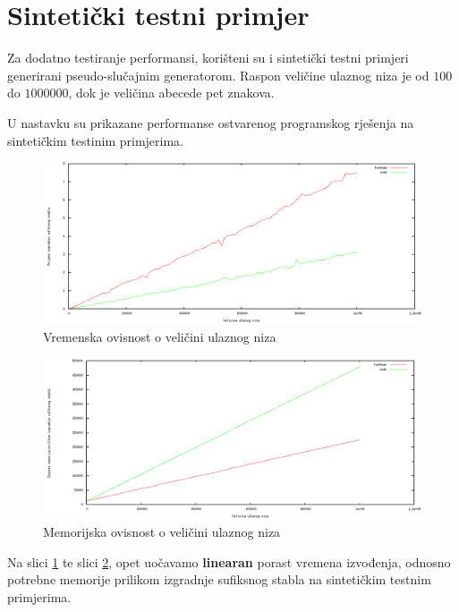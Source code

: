 \documentclass[times, utf8, seminar, numeric]{fer}
\begin{document}
\section{Sintetički testni primjer}
	Za dodatno testiranje performansi, korišteni su i sintetički testni primjeri generirani pseudo-slučajnim generatorom. Raspon veličine ulaznog niza je od $100$ do $1000000$, dok je veličina abecede pet  znakova.
	
	U nastavku su prikazane performanse ostvarenog programskog rješenja na sintetičkim testinim primjerima.

\begin{figure}[h!]	
	\centering
	\includegraphics[width=1\textwidth]{media/time_r.png}
	\caption{Vremenska ovisnost o veličini ulaznog niza}
	\label{image:timer}
\end{figure}

\begin{figure}[h!]	
	\centering
	\includegraphics[width=1\textwidth]{media/memory_r.png}
	\caption{Memorijska ovisnost o veličini ulaznog niza}
	\label{image:memoryr}
\end{figure}

\pagebreak

Na slici \ref{image:timer} te slici \ref{image:memoryr}, opet uočavamo \textbf{linearan} porast vremena izvođenja, odnosno potrebne memorije prilikom izgradnje sufiksnog stabla na sintetičkim testnim primjerima.
\end{document}
